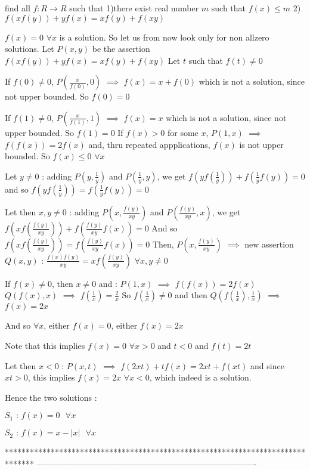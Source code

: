 \begin{solution}
	\begin{tcolorbox}find all $f:R\longrightarrow{R}$ such that
1)there exist real number $m$ such that $f(x)\leq{m}$ 
2)$f(xf(y))+yf(x)=xf(y)+f(xy)$\end{tcolorbox}
$f(x)=0$ $\forall x$ is a solution. So let us from now look only for non allzero solutions.
Let $P(x,y)$ be the assertion $f(xf(y))+yf(x)=xf(y)+f(xy)$
Let $t$ such that $f(t)\ne 0$

If $f(0)\ne 0$, $P(\frac{x}{f(0)},0)$ $\implies$ $f(x)=x+f(0)$ which is not a solution, since not upper bounded. So $f(0)=0$

If $f(1)\ne 0$, $P(\frac x{f(1)},1)$ $\implies$ $f(x)=x$ which is not a solution, since not upper bounded. So $f(1)=0$
If $f(x)>0$ for some $x$, $P(1,x)$ $\implies$ $f(f(x))=2f(x)$ and, thru repeated appplications, $f(x)$ is not upper bounded. So $f(x)\le 0$ $\forall x$

Let $y\ne 0$ : adding $P(y,\frac 1y)$ and $P(\frac 1y,y)$, we get $f(yf(\frac 1y))+f(\frac 1yf(y))=0$ and so $f(yf(\frac 1y))=f(\frac 1yf(y))=0$

Let then $x,y\ne 0$ : adding $P(x,\frac {f(y)}{xy})$ and $P(\frac {f(y)}{xy},x)$, we get $f(xf(\frac {f(y)}{xy}))+f(\frac {f(y)}{xy}f(x))=0$
And so $f(xf(\frac {f(y)}{xy}))=f(\frac {f(y)}{xy}f(x))=0$
Then, $P(x,\frac {f(y)}{xy})$ $\implies$ new assertion $Q(x,y)$ : $\frac {f(x)f(y)}{xy}=xf(\frac {f(y)}{xy})$ $\forall x,y\ne 0$

If $f(x)\ne 0$, then $x\ne 0$ and :
$P(1,x)$ $\implies$ $f(f(x))=2f(x)$
$Q(f(x),x)$ $\implies$ $f(\frac 1x)=\frac 2x$ 
So $f(\frac 1x)\ne 0$ and then $Q(f(\frac 1x),\frac 1x)$ $\implies$ $f(x)=2x$ 

And so $\forall x$, either $f(x)=0$, either $f(x)=2x$

Note that this implies $f(x)=0$ $\forall x>0$ and $t<0$ and $f(t)=2t$

Let then $x<0$ : $P(x,t)$ $\implies$ $f(2xt)+tf(x)=2xt+f(xt)$ and since $xt>0$, this implies $f(x)=2x$ $\forall x<0$, which indeed is a solution.

Hence the two solutions  :

$\boxed{S_1\text{  :  }f(x)=0\text{  }\forall x}$

$\boxed{S_2\text{  :  }f(x)=x-|x|\text{  }\forall x}$
\end{solution}
*******************************************************************************
-------------------------------------------------------------------------------

